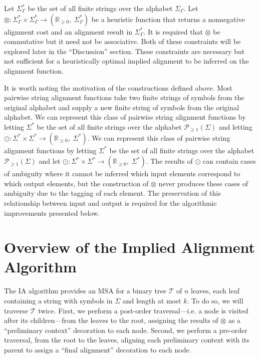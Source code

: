 \documentclass{bmcart}
\newcommand*\NEPowerset{\mathcal{P}_{\geq 1}}
\newcommand*\NonNegReals{\mathbb{R}_{\geq 0}}
\begin{document}
Let $\Sigma^{*}_{\Gamma}$ be the set of all finite strings over the alphabet $\Sigma_{\Gamma}$.
Let $\otimes : \Sigma^{*}_{\Gamma} \times \Sigma^{*}_{\Gamma} \rightarrow \left(\NonNegReals,\; \Sigma^{*}_{\Gamma}\right)$ be a heuristic function that returns a nonnegative alignment cost and an alignment result in $\Sigma^{*}_{\Gamma}$.
It is required that $\otimes$ be commutative but it need not be associative.
Both of these constraints will be explored later in the ``Discussion'' section.
These constraints are necessary but not sufficient for a heuristically optimal implied alignment to be inferred on the alignment function.

It is worth noting the motivation of the constructions defined above. 
Most pairwise string alignment functions take two finite strings of symbols from the original alphabet and supply a new finite string of symbols from the original alphabet.
We can represent this class of pairwise string alignment functions by letting $\Sigma^{*}$ be the set of all finite strings over the alphabet $\NEPowerset (\Sigma)$ and letting $\odot: \Sigma^{*} \times \Sigma^{*} \rightarrow \left(\NonNegReals,\; \Sigma^{*} \right)$.
We can represent this class of pairwise string alignment functions by letting $\Sigma^{*}$ be the set of all finite strings over the alphabet $\NEPowerset (\Sigma)$ and let $\odot: \Sigma^{*} \times \Sigma^{*} \rightarrow \left(\NonNegReals,\; \Sigma^{*} \right)$.
The results of $\odot$ can contain cases of ambiguity where it cannot be inferred which input elements correspond to which output elements, but the construction of $\otimes$ never produces these cases of ambiguity due to the tagging of each element.
The preservation of this relationship between input and output is required for the algorithmic improvements presented below.


\section*{Overview of the Implied Alignment Algorithm}

The IA algorithm provides an MSA for a binary tree $\mathcal{T}$ of $n$ leaves, each leaf containing a string with symbols in $\Sigma$ and length at most $k$.
To do so, we will traverse $\mathcal{T}$ twice.
First, we perform a post-order traversal---i.e. a node is visited after its children---from the leaves to the root, assigning the results of $\otimes$ as a ``preliminary context'' decoration to each node.
Second, we perform a pre-order traversal, from the root to the leaves, aligning each preliminary context with its parent to assign a ``final alignment'' decoration to each node.
\end{document}
